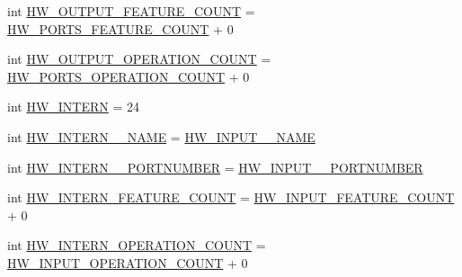 \begin{DoxyCompactItemize}
\item 
int \hyperlink{interfaceshootingmachineemfmodel_1_1_shootingmachineemfmodel_package_aefdcd2b83d8884b60a471a861146421f}{H\-W\-\_\-\-O\-U\-T\-P\-U\-T\-\_\-\-F\-E\-A\-T\-U\-R\-E\-\_\-\-C\-O\-U\-N\-T} = \hyperlink{interfaceshootingmachineemfmodel_1_1_shootingmachineemfmodel_package_a07e6faf7371ad8351da3b4600954f204}{H\-W\-\_\-\-P\-O\-R\-T\-S\-\_\-\-F\-E\-A\-T\-U\-R\-E\-\_\-\-C\-O\-U\-N\-T} + 0
\item 
int \hyperlink{interfaceshootingmachineemfmodel_1_1_shootingmachineemfmodel_package_a911c6904fe8043130ce479d0e1d2e0b6}{H\-W\-\_\-\-O\-U\-T\-P\-U\-T\-\_\-\-O\-P\-E\-R\-A\-T\-I\-O\-N\-\_\-\-C\-O\-U\-N\-T} = \hyperlink{interfaceshootingmachineemfmodel_1_1_shootingmachineemfmodel_package_a5f85f99a2b80ea1b9f8c81dc620e69b3}{H\-W\-\_\-\-P\-O\-R\-T\-S\-\_\-\-O\-P\-E\-R\-A\-T\-I\-O\-N\-\_\-\-C\-O\-U\-N\-T} + 0
\item 
int \hyperlink{interfaceshootingmachineemfmodel_1_1_shootingmachineemfmodel_package_a0ff0aa7656387125821862056ec11ca9}{H\-W\-\_\-\-I\-N\-T\-E\-R\-N} = 24
\item 
int \hyperlink{interfaceshootingmachineemfmodel_1_1_shootingmachineemfmodel_package_a9b9bd65de59c357ad73e62c76be9b4dc}{H\-W\-\_\-\-I\-N\-T\-E\-R\-N\-\_\-\-\_\-\-N\-A\-M\-E} = \hyperlink{interfaceshootingmachineemfmodel_1_1_shootingmachineemfmodel_package_aca3df42c3daea63181ee2a2aa5ed1fac}{H\-W\-\_\-\-I\-N\-P\-U\-T\-\_\-\-\_\-\-N\-A\-M\-E}
\item 
int \hyperlink{interfaceshootingmachineemfmodel_1_1_shootingmachineemfmodel_package_a5e3789ada86b1c7b8900abdc8f386a9f}{H\-W\-\_\-\-I\-N\-T\-E\-R\-N\-\_\-\-\_\-\-P\-O\-R\-T\-N\-U\-M\-B\-E\-R} = \hyperlink{interfaceshootingmachineemfmodel_1_1_shootingmachineemfmodel_package_ac54ab200e6b01aa749998ba59d67d36b}{H\-W\-\_\-\-I\-N\-P\-U\-T\-\_\-\-\_\-\-P\-O\-R\-T\-N\-U\-M\-B\-E\-R}
\item 
int \hyperlink{interfaceshootingmachineemfmodel_1_1_shootingmachineemfmodel_package_a0c7497ff6a6c4b983c5591ef81938513}{H\-W\-\_\-\-I\-N\-T\-E\-R\-N\-\_\-\-F\-E\-A\-T\-U\-R\-E\-\_\-\-C\-O\-U\-N\-T} = \hyperlink{interfaceshootingmachineemfmodel_1_1_shootingmachineemfmodel_package_a535000a6deb669d11da173c3d44815a2}{H\-W\-\_\-\-I\-N\-P\-U\-T\-\_\-\-F\-E\-A\-T\-U\-R\-E\-\_\-\-C\-O\-U\-N\-T} + 0
\item 
int \hyperlink{interfaceshootingmachineemfmodel_1_1_shootingmachineemfmodel_package_adbbe73334258683c2c965998d0696d81}{H\-W\-\_\-\-I\-N\-T\-E\-R\-N\-\_\-\-O\-P\-E\-R\-A\-T\-I\-O\-N\-\_\-\-C\-O\-U\-N\-T} = \hyperlink{interfaceshootingmachineemfmodel_1_1_shootingmachineemfmodel_package_af19839a18788f1df9c7076b1f331b660}{H\-W\-\_\-\-I\-N\-P\-U\-T\-\_\-\-O\-P\-E\-R\-A\-T\-I\-O\-N\-\_\-\-C\-O\-U\-N\-T} + 0

\end{DoxyCompactItemize}
